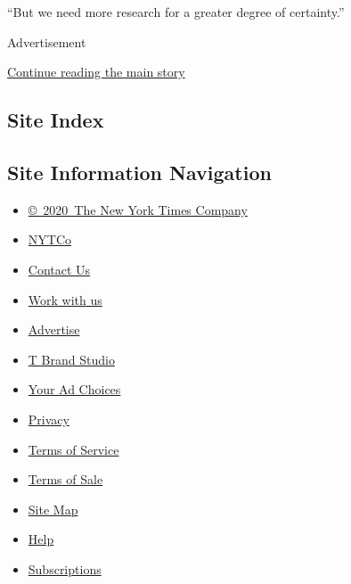 ``But we need more research for a greater degree of certainty.''

Advertisement

\protect\hyperlink{after-bottom}{Continue reading the main story}

\hypertarget{site-index}{%
\subsection{Site Index}\label{site-index}}

\hypertarget{site-information-navigation}{%
\subsection{Site Information
Navigation}\label{site-information-navigation}}

\begin{itemize}
\tightlist
\item
  \href{https://help.nytimes.com/hc/en-us/articles/115014792127-Copyright-notice}{©~2020~The
  New York Times Company}
\end{itemize}

\begin{itemize}
\tightlist
\item
  \href{https://www.nytco.com/}{NYTCo}
\item
  \href{https://help.nytimes.com/hc/en-us/articles/115015385887-Contact-Us}{Contact
  Us}
\item
  \href{https://www.nytco.com/careers/}{Work with us}
\item
  \href{https://nytmediakit.com/}{Advertise}
\item
  \href{http://www.tbrandstudio.com/}{T Brand Studio}
\item
  \href{https://www.nytimes.com/privacy/cookie-policy\#how-do-i-manage-trackers}{Your
  Ad Choices}
\item
  \href{https://www.nytimes.com/privacy}{Privacy}
\item
  \href{https://help.nytimes.com/hc/en-us/articles/115014893428-Terms-of-service}{Terms
  of Service}
\item
  \href{https://help.nytimes.com/hc/en-us/articles/115014893968-Terms-of-sale}{Terms
  of Sale}
\item
  \href{https://spiderbites.nytimes.com}{Site Map}
\item
  \href{https://help.nytimes.com/hc/en-us}{Help}
\item
  \href{https://www.nytimes.com/subscription?campaignId=37WXW}{Subscriptions}
\end{itemize}
